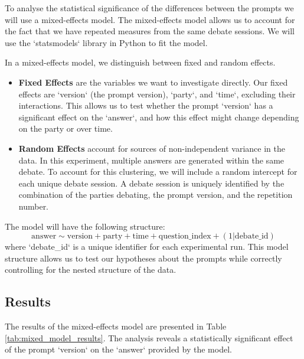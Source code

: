 \documentclass[12pt]{article}
\begin{document}
To analyse the statistical significance of the differences between the prompts we will use a mixed-effects model. The mixed-effects model allows us to account for the fact that we have repeated measures from the same debate sessions. We will use the `statsmodels` library in Python to fit the model.

In a mixed-effects model, we distinguish between fixed and random effects.
\begin{itemize}
    \item \textbf{Fixed Effects} are the variables we want to investigate directly. Our fixed effects are `version` (the prompt version), `party`, and `time`, excluding their interactions. This allows us to test whether the prompt `version` has a significant effect on the `answer`, and how this effect might change depending on the party or over time.
    \item \textbf{Random Effects} account for sources of non-independent variance in the data. In this experiment, multiple answers are generated within the same debate. To account for this clustering, we will include a random intercept for each unique debate session. A debate session is uniquely identified by the combination of the parties debating, the prompt version, and the repetition number.
\end{itemize}

The model will have the following structure:
\begin{equation}
    \text{answer} \sim \text{version} + \text{party} + \text{time} + \text{question\_index} + (1 | \text{debate\_id})
\end{equation}
where `debate\_id` is a unique identifier for each experimental run. This model structure allows us to test our hypotheses about the prompts while correctly controlling for the nested structure of the data.

\subsection{Results}
The results of the mixed-effects model are presented in Table \ref{tab:mixed_model_results}. The analysis reveals a statistically significant effect of the prompt `version` on the `answer` provided by the model.
\end{document}
